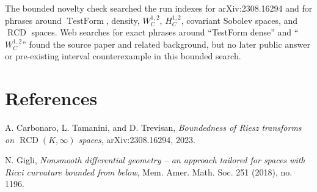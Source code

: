 \documentclass[11pt]{article}
\newcommand{\TestForm}{\operatorname{TestForm}}
\newcommand{\RCD}{\operatorname{RCD}}
\begin{document}
The bounded novelty check searched the run indexes for arXiv:2308.16294 and
for phrases around \(\TestForm\), density, \(W_C^{1,2}\), \(H_C^{1,2}\),
covariant Sobolev spaces, and \(\RCD\) spaces. Web searches for exact phrases
around ``TestForm dense'' and ``\(W_C^{1,2}\)'' found the source paper and
related background, but no later public answer or pre-existing interval
counterexample in this bounded search.

\section*{References}

A. Carbonaro, L. Tamanini, and D. Trevisan,
\emph{Boundedness of Riesz transforms on \(\RCD(K,\infty)\) spaces},
arXiv:2308.16294, 2023.

N. Gigli, \emph{Nonsmooth differential geometry -- an approach tailored for
spaces with Ricci curvature bounded from below}, Mem. Amer. Math. Soc. 251
(2018), no. 1196.
\end{document}
